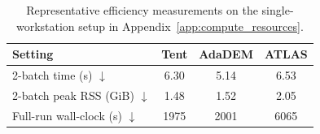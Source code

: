 \begin{table}
\vspace{-10pt}
\centering
\scriptsize
\setlength{\tabcolsep}{4pt}
\renewcommand{\arraystretch}{1.06}
\caption{Representative efficiency measurements on the single-workstation setup in Appendix~\ref{app:compute_resources}.}
\label{tab:appendix_efficiency}
\begin{tabular}{lccc}
\toprule
Setting & Tent & AdaDEM & ATLAS \\
\midrule
2-batch time (s) $\downarrow$ & 6.30 & 5.14 & 6.53 \\
2-batch peak RSS (GiB) $\downarrow$ & 1.48 & 1.52 & 2.05 \\
Full-run wall-clock (s) $\downarrow$ & 1975 & 2001 & 6065 \\
\bottomrule
\end{tabular}
\vspace{-8pt}
\end{table}